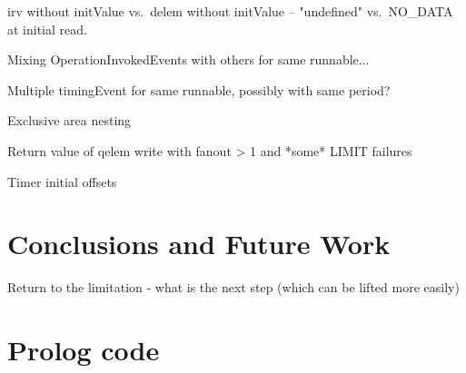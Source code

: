 \documentclass[twocolumn]{article}
\begin{document}
irv without initValue vs.\ delem without initValue -- "undefined" vs.\ NO\_DATA at initial read.

Mixing OperationInvokedEvents with others for same runnable...

Multiple timingEvent for same runnable, possibly with same period?

Exclusive area nesting

Return value of qelem write with fanout > 1 and *some* LIMIT failures

Timer initial offsets



\section{Conclusions and Future Work}
\label{sec:Conc}

Return to the limitation - what is the next step (which can be lifted more easily)

\onecolumn
\appendix
\section{Prolog code}
\label{sec:Prolog}





% 
\end{document}
